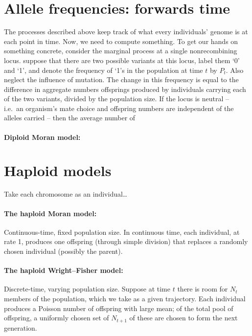 \section{Allele frequencies: forwards time}

The processes described above keep track of what every individuals' genome is at each point in time.
Now, we need to compute something.
To get our hands on something concrete, consider the marginal process at a single nonrecombining locus.
suppose that there are two possible variants at this locus,
label them `0' and `1',
and denote the frequency of `1's in the population at time $t$ by $P_t$.
Also neglect the influence of mutation.
The change in this frequency is equal to the difference in aggregate numbers offsprings produced by individuals 
carrying each of the two variants,
divided by the population size.
If the locus is neutral
-- i.e.\ an organism's mate choice and offspring numbers are independent of the alleles carried --
then the average number of 

\paragraph{Diploid Moran model:}


\section{Haploid models}

Take each chromosome as an individual\ldots

\paragraph{The haploid Moran model:}
Continuous-time, fixed population size.
In continuous time, each individual, at rate 1, 
produces one offspring (through simple division)
that replaces a randomly chosen individual (possibly the parent).

\paragraph{The haploid Wright--Fisher model:}
Discrete-time, varying population size.
Suppose at time $t$ there is room for $N_t$ members of the population,
which we take as a given trajectory.
Each individual produces a Poisson number of offspring with large mean;
of the total pool of offspring, a uniformly chosen set of $N_{t+1}$ of these
are chosen to form the next generation.
